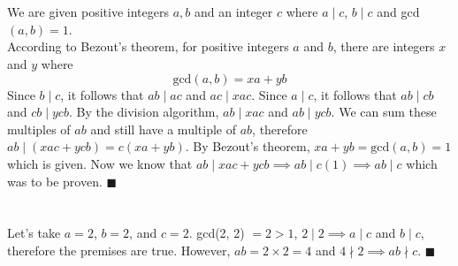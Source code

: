 \documentclass{article}
\begin{document}
\section{}
We are given positive integers $a, b$ and an integer $c$ where $a \mid c$, $b \mid c$ and gcd$(a,b) = 1$. \\
According to Bezout's theorem, for positive integers $a$ and $b$, there are integers $x$ and $y$ where
\begin{equation*}
    \text{gcd}(a,b) = xa+yb
\end{equation*}
Since $b\mid c$, it follows that $ab\mid ac$ and $ac \mid xac$. 
Since $a\mid c$, it follows that $ab\mid cb$ and $cb \mid ycb$. 
By the division algorithm, $ab\mid xac$ and $ab\mid ycb$. 
We can sum these multiples of $ab$ and still have a multiple of $ab$, therefore $ab\mid (xac+ycb) = c(xa+yb)$. 
By Bezout's theorem, $xa+yb = \text{gcd}(a,b) = 1$ which is given. 
Now we know that $ab\mid xac+ycb \implies ab\mid c(1) \implies ab\mid c$ which was to be proven. $\blacksquare$


\section{}
Let's take $a=2$, $b=2$, and $c=2$. gcd(2, 2) $= 2 >1$, $2\mid 2 \implies a\mid c$ and $b\mid c$, therefore the premises are true. However, $ab = 2 \times 2 = 4$ and $4 \nmid 2 \implies ab \nmid c$. $\blacksquare$
\end{document}
